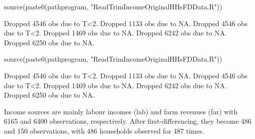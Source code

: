 \begin{Schunk}
\begin{Sinput}
source(paste0(pathprogram, "ReadTrimIncomeOriginalHHsFDData.R"))
\end{Sinput}
\begin{Soutput}
Dropped 4546 obs due to T<2.
Dropped 1133 obs due to NA.
Dropped 4546 obs due to T<2.
Dropped 1469 obs due to NA.
Dropped 6242 obs due to NA.
Dropped 6250 obs due to NA.
\end{Soutput}
\end{Schunk}
\begin{Schunk}
\begin{Sinput}
source(paste0(pathprogram, "ReadTrimIncomeOriginalHHsFDData.R"))
\end{Sinput}
\begin{Soutput}
Dropped 4546 obs due to T<2.
Dropped 1133 obs due to NA.
Dropped 4546 obs due to T<2.
Dropped 1469 obs due to NA.
Dropped 6242 obs due to NA.
Dropped 6250 obs due to NA.
\end{Soutput}
\end{Schunk}

Income sources are mainly labour incomes (\textsf{lab}) and farm revenues (\textsf{far}) with 6165 and 6400 observations, respectively. After first-differencing, they become 486 and 150 observations, with 486 households observed for 487 times. 



